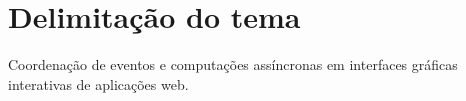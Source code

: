 \section{Delimitação do tema}\label{ldelimitacao}

Coordenação de eventos e computações assíncronas em
interfaces gráficas interativas de aplicações web.
